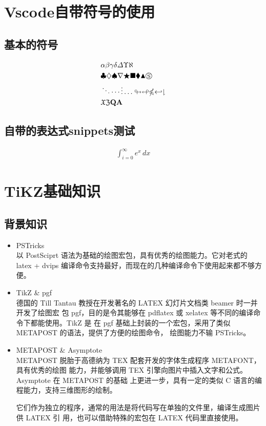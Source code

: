 \documentclass[fontset=windows]{article}
\begin{document}
\begin{center}
\tableofcontents
\end{center}
\newpage

\section{Vscode自带符号的使用}
\subsection{基本的符号}
\begin{align*}
    &\alpha \beta \gamma \delta \varDelta \Upsilon \aleph \\
    &\clubsuit \diamondsuit \spadesuit \nabla \bigstar \blacksquare \blacklozenge \blacktriangle \circledS \\
    &\ddots \cdots \vdots \ldots \looparrowright \looparrowleft \nleqslant \hookleftarrow \downharpoonright \\
    &\mathfrak{X} \mathfrak{Z} \mathbf{Q} \mathbf{A} 
\end{align*}

\subsection{自带的表达式snippets测试}
\begin{align*}
    \int_{i=0}^{\infty} e^x \,dx 
\end{align*}


\section{TiKZ基础知识}

\subsection{背景知识}

\begin{itemize}
    \item PSTricks\\
    以 PostSciprt 语法为基础的绘图宏包，具有优秀的绘图能力。它对老式的 latex + dvips
    编译命令支持最好，而现在的几种编译命令下使用起来都不够方便。
    \item TikZ \& pgf\\
    德国的 Till Tantau 教授在开发著名的 LATEX 幻灯片文档类 beamer 时一并开发了绘图宏
    包 pgf，目的是令其能够在 pdflatex 或 xelatex 等不同的编译命令下都能使用。TikZ 是
    在 pgf 基础上封装的一个宏包，采用了类似 METAPOST 的语法，提供了方便的绘图命令，
    绘图能力不输 PSTricks。
    \item METAPOST \& Asymptote\\
    METAPOST 脱胎于高德纳为 TEX 配套开发的字体生成程序 METAFONT，具有优秀的绘图
    能力，并能够调用 TEX 引擎向图片中插入文字和公式。Asymptote 在 METAPOST 的基础
    上更进一步，具有一定的类似 C 语言的编程能力，支持三维图形的绘制。

    它们作为独立的程序，通常的用法是将代码写在单独的文件里，编译生成图片供 LATEX 引
    用，也可以借助特殊的宏包在 LATEX 代码里直接使用。
\end{itemize}
\end{document}

